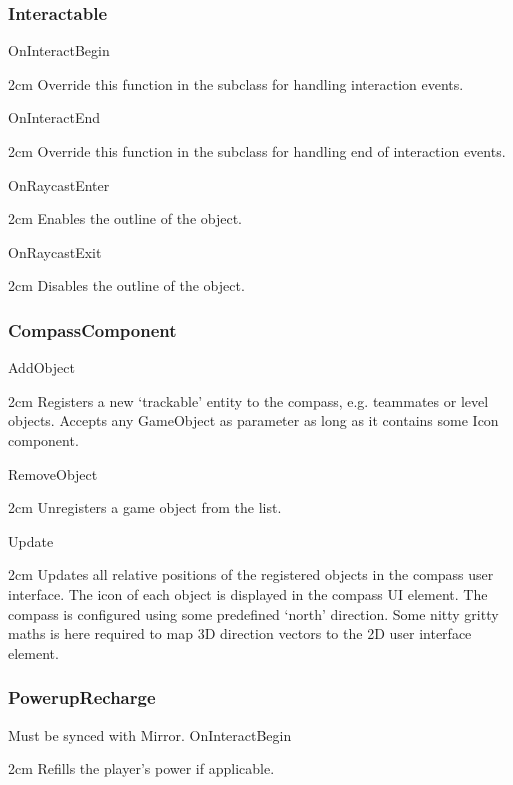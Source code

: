 \documentclass[11pt]{article}
\newenvironment{indentall}{\begin{adjustwidth}{2cm}{}}{\end{adjustwidth}}
\begin{document}
\subsubsection{Interactable}
OnInteractBegin
\begin{indentall}
Override this function in the subclass for handling interaction events.
\end{indentall}
OnInteractEnd
\begin{indentall}
Override this function in the subclass for handling end of interaction events.
\end{indentall}
OnRaycastEnter
\begin{indentall}
Enables the outline of the object.
\end{indentall}
OnRaycastExit
\begin{indentall}
Disables the outline of the object.
\end{indentall}

\subsubsection{CompassComponent}
AddObject
\begin{indentall}
Registers a new ‘trackable’ entity to the compass, e.g. teammates or level objects. Accepts any GameObject as parameter as long as it contains some Icon component.
\end{indentall}
RemoveObject
\begin{indentall}
Unregisters a game object from the list.
\end{indentall}
Update
\begin{indentall}
Updates all relative positions of the registered objects in the compass user interface. The icon of each object is displayed in the compass UI element. The compass is configured using some predefined ‘north’ direction. Some nitty gritty maths is here required to map 3D direction vectors to the 2D user interface element.
\end{indentall}

\subsubsection{PowerupRecharge}
Must be synced with Mirror.
\newline
\newline OnInteractBegin
\begin{indentall}
Refills the player’s power if applicable.
\end{indentall}
\end{document}
